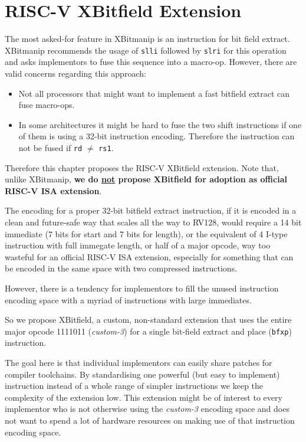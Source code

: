 \chapter{RISC-V XBitfield Extension}

The most asked-for feature in XBitmanip is an instruction for bit field
extract. XBitmanip recommends the usage of {\tt slli} followed by {\tt slri}
for this operation and asks implementors to fuse this sequence into a macro-op.
However, there are valid concerns regarding this approach:

\begin{itemize}
\item Not all processors that might want to implement a fast bitfield extract
can fuse macro-ops.
\item In some architectures it might be hard to fuse the two shift instructions
if one of them is using a 32-bit instruction encoding. Therefore the instruction
can not be fused if {\tt rd} $\ne$ {\tt rs1}.
\end{itemize}

Therefore this chapter proposes the RISC-V XBitfield extension. Note that, unlike
XBitmanip, {\bf we do \underline{not} propose XBitfield for adoption as official RISC-V ISA extension}.

The encoding for a proper 32-bit bitfield extract instruction, if it is encoded
in a clean and future-safe way that scales all the way to RV128, would require
a 14 bit immediate (7 bits for start and 7 bits for length), or the equivalent
of 4 I-type instruction with full immegate length, or half of a major opcode,
way too wasteful for an official RISC-V ISA extension, especially for something
that can be encoded in the same space with two compressed instructions.

However, there is a tendency for implementors to fill the unused instruction
encoding space with a myriad of instructions with large immediates.~\cite{Ri5cy}

So we propose XBitfield, a custom, non-standard extension that uses the entire
major opcode 1111011 ({\it custom-3}) for a single bit-field extract and place
({\tt bfxp}) instruction.

The goal here is that individual implementors can easily share patches for
compiler toolchains. By standardising one powerful (but easy to implement)
instruction instead of a whole range of simpler instructions we keep the
complexity of the extension low. This extension might be of interest to
every implementor who is not otherwise using the {\it custom-3} encoding
space and does not want to spend a lot of hardware resources on making
use of that instruction encoding space.


